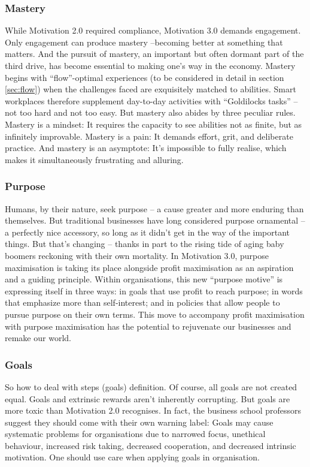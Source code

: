 \subsubsection{Mastery}
While Motivation 2.0 required compliance, Motivation 3.0 demands engagement. Only engagement can produce mastery --becoming better at something that matters. And the pursuit of mastery, an important but often dormant part of the third drive, has become essential to making one’s way in the economy. Mastery begins with ``flow''-optimal experiences (to be considered in detail in section \ref{sec:flow}) when the challenges faced are exquisitely matched to abilities. Smart workplaces therefore supplement day-to-day activities with ``Goldilocks tasks'' -- not too hard and not too easy. But mastery also abides by three peculiar rules. Mastery is a mindset: It requires the capacity to see abilities not as finite, but as infinitely improvable. Mastery is a pain: It demands effort, grit, and deliberate practice. And mastery is an asymptote: It’s impossible to fully realise, which makes it simultaneously frustrating and alluring.

\subsubsection{Purpose}
Humans, by their nature, seek purpose -- a cause greater and more enduring than themselves. But traditional businesses have long considered purpose ornamental -- a perfectly nice accessory, so long as it didn’t get in the way of the important things. But that’s changing -- thanks in part to the rising tide of aging baby boomers reckoning with their own mortality. In Motivation 3.0, purpose maximisation is taking its place alongside profit maximisation as an aspiration and a guiding principle. Within organisations, this new ``purpose motive'' is expressing itself in three ways: in goals that use profit to reach purpose; in words that emphasize more than self-interest; and in policies that allow people to pursue purpose on their own terms. This move to accompany profit maximisation with purpose maximisation has the potential to rejuvenate our businesses and remake our world.


\subsubsection{Goals}
So how to deal with steps (goals) definition. Of course, all goals are not created equal. Goals and extrinsic rewards aren’t inherently corrupting. But goals are more toxic than Motivation 2.0 recognises. In fact, the business school professors suggest they should come with their own warning label: Goals may cause systematic problems for organisations due to narrowed focus, unethical behaviour, increased risk taking, decreased cooperation, and decreased intrinsic motivation. One should use care when applying goals in organisation.

